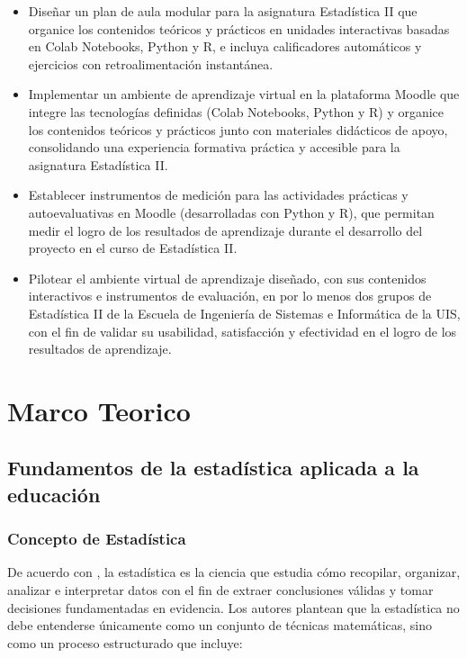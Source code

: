 \documentclass[letter,oneside,12pt,spanish]{report}
\begin{document}
\begin{itemize}
    \item Diseñar un plan de aula modular para la asignatura Estadística II que organice los contenidos teóricos y prácticos en unidades interactivas basadas en Colab Notebooks, Python y R, e incluya calificadores automáticos y ejercicios con retroalimentación instantánea.
    
    \item Implementar un ambiente de aprendizaje virtual en la plataforma Moodle que integre las tecnologías definidas (Colab Notebooks, Python y R) y organice los contenidos teóricos y prácticos junto con materiales didácticos de apoyo, consolidando una experiencia formativa práctica y accesible para la asignatura Estadística II.
    
    \item Establecer instrumentos de medición para las actividades prácticas y autoevaluativas en Moodle (desarrolladas con Python y R), que permitan medir el logro de los resultados de aprendizaje durante el desarrollo del proyecto en el curso de Estadística II.

    \item Pilotear el ambiente virtual de aprendizaje diseñado, con sus contenidos interactivos e instrumentos de evaluación, en por lo menos dos grupos de Estadística II de la Escuela de Ingeniería de Sistemas e Informática de la UIS, con el fin de validar su usabilidad, satisfacción y efectividad en el logro de los resultados de aprendizaje.

\end{itemize}


\newpage

\chapter{Marco Teorico}

\section{Fundamentos de la estadística aplicada a la educación}

\subsection{Concepto de Estadística}

De acuerdo con \textcite{montgomery1996}, la estadística es la ciencia que estudia cómo recopilar, organizar, analizar e interpretar datos con el fin de extraer conclusiones válidas y tomar decisiones fundamentadas en evidencia. Los autores plantean que la estadística no debe entenderse únicamente como un conjunto de técnicas matemáticas, sino como un proceso estructurado que incluye:
\end{document}
